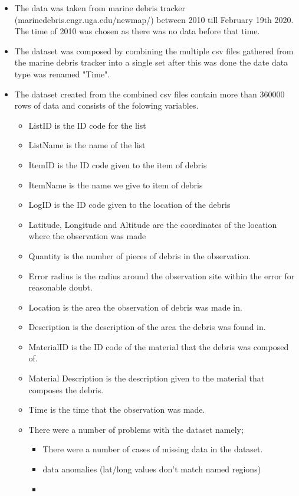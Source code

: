 \documentclass[10pt]{article}\usepackage[]{graphicx}\usepackage[]{color}
\begin{document}
\begin{itemize}

\item The data was taken from marine debris tracker (marinedebris.engr.uga.edu/newmap/) between 2010 till February 19th 2020. The time of 2010 was chosen as there was no data before that time.
\item The dataset was composed by combining the multiple csv files gathered from the marine debris tracker into a single set after this was done the date data type was renamed "Time". 
\item The dataset created from the combined csv files contain more than 360000 rows of data and consists of the folowing variables.
  \begin{itemize}
  \item ListID is the ID code for the list
  \item ListName is the name of the list
  \item ItemID is the ID code given to the item of debris
  \item ItemName is the name we give to item of debris
  \item LogID is the ID code given to the location of the debris
  \item Latitude, Longitude and Altitude are the coordinates of the location where the observation was made
  \item Quantity is the number of pieces of debris in the observation.
  \item Error radius is the radius around the observation site within the error for reasonable doubt.
  \item Location is the area the observation of debris was made in.
  \item Description is the description of the area the debris was found in.
  \item MaterialID is the ID code of the material that the debris was composed of. 
  \item Material Description is the description given to the material that composes the debris.
  \item Time is the time that the observation was made. 
\item There were a number of problems with the dataset namely;
  \begin{itemize}
  \item There were a number of cases of missing data in the dataset. 
  \item data anomalies (lat/long values don't match named regions)
  \item 
  \end{itemize}
\end{itemize}



\end{itemize}
\end{document}
